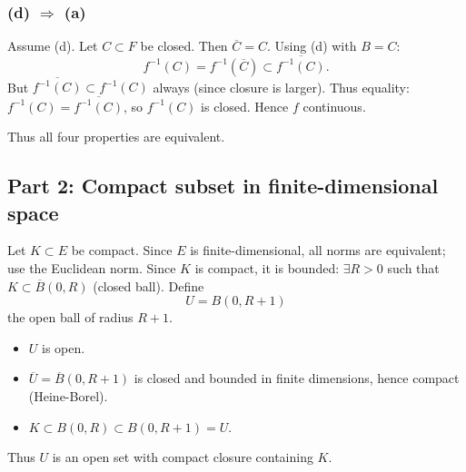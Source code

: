 \documentclass[12pt]{article}
\begin{document}
\begin{answerbox}
\subsubsection*{(d) \(\Rightarrow\) (a)}
Assume (d). Let \(C\subset F\) be closed. Then \(\overline{C}=C\). Using (d) with \(B=C\):
\[
f^{-1}(C) = f^{-1}(\overline{C}) \subset \overline{f^{-1}(C)}.
\]
But \(\overline{f^{-1}(C)} \subset f^{-1}(C)\) always (since closure is larger). Thus equality: \(f^{-1}(C)=\overline{f^{-1}(C)}\), so \(f^{-1}(C)\) is closed. Hence \(f\) continuous.

Thus all four properties are equivalent.

\subsection*{Part 2: Compact subset in finite-dimensional space}
Let \(K\subset E\) be compact. Since \(E\) is finite-dimensional, all norms are equivalent; use the Euclidean norm. Since \(K\) is compact, it is bounded: \(\exists R>0\) such that \(K\subset \overline{B}(0,R)\) (closed ball). Define
\[
U = B(0, R+1)
\]
the open ball of radius \(R+1\).

\begin{itemize}
    \item \(U\) is open.
    \item \(\overline{U} = \overline{B}(0,R+1)\) is closed and bounded in finite dimensions, hence compact (Heine-Borel).
    \item \(K\subset B(0,R) \subset B(0,R+1) = U\).
\end{itemize}
Thus \(U\) is an open set with compact closure containing \(K\).
\end{answerbox}

\end{document}
